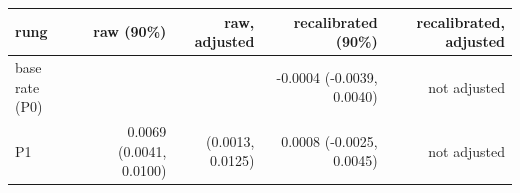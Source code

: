 \begin{tabular}{lrrrr}
\toprule
rung & raw (90\%) & raw, adjusted & recalibrated (90\%) & recalibrated, adjusted \\
\midrule
base rate (P0) &  &  & -0.0004 (-0.0039, 0.0040) & not adjusted \\
P1 & 0.0069 (0.0041, 0.0100) & (0.0013, 0.0125) & 0.0008 (-0.0025, 0.0045) & not adjusted \\

\end{tabular}
